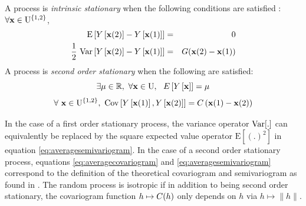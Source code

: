 \begin{definition}
A process is {\em intrinsic stationary} when the following conditions are satisfied :  $\forall \mathbf{x}\in\mathrm{U}^{\{1,2\}}$,
\begin{eqnarray}
    \mathrm{E}\left[Y\left[\mathbf{x}(2)\right]-Y\left[\mathbf{x}(1)\right]\right]&=&0\\
    \frac12~\mathrm{Var}\left[Y\left[\mathbf{x}(2)\right]-Y\left[\mathbf{x}(1)\right]\right]&=&G(\mathbf{x}(2)-\mathbf{x}(1))\label{eq:semivariogram}
\end{eqnarray}
A process is {\em second order stationary} when the following are satisfied:
\begin{equation}
\exists\mu\in\mathbb{R},~    \forall\mathbf{x}\in \mathrm{U},~~ E\left[Y\left[\mathbf{x}\right]\right]=\mu
\end{equation}
\begin{equation} \label{eq:covariogram}
    \forall~\mathbf{x}\in \mathrm{U}^{\{1,2\}}, ~\mathrm{Cov}\left[Y\left[\mathbf{x}(1)\right],Y\left[\mathbf{x}(2)\right]\right]=C\left(\mathbf{x}(1)-\mathbf{x}(2)\right)
\end{equation}
\end{definition}
In the case of a first order stationary process, the variance operator $\mathrm{Var}[.]$ can equivalently be replaced by the square expected value operator $\mathrm{E}[(.)^2]$ in equation \eqref{eq:averagesemivariogram}.
In the case of a second order stationary process, equations \eqref{eq:averagecovariogram} and \eqref{eq:averagesemivariogram} correspond to the definition of the theoretical covariogram and semivariogram as found in \citet[p.~53 and p.~58]{cressie2015statistics}.
The random process is isotropic if in addition to being second order stationary, the covariogram function $h\mapsto C(h)$ only depends on $h$ via $h\mapsto\|h\|$.


